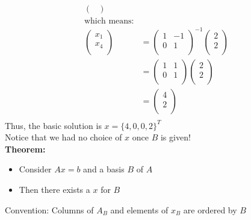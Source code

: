 \documentclass[letterpaper, 12pt]{article}
\newcommand{\red}[1]{{\color{red}{#1}}}
\begin{document}
\begin{align*}
\begin{pmatrix}
        \end{pmatrix}\\
        \text{which means:}\\
        \begin{pmatrix}
            x_1\\x_4\\
        \end{pmatrix} &= \begin{pmatrix}
            1 & -1\\
            0 & 1\\
        \end{pmatrix} ^ {-1} \begin{pmatrix}
            2\\2\\
        \end{pmatrix}\\
        &= \begin{pmatrix}
            1 & 1\\
            0 & 1\\
        \end{pmatrix}\begin{pmatrix}
            2\\2\\
        \end{pmatrix}\\
        &= \begin{pmatrix}
            4\\2\\
        \end{pmatrix}\\
    \end{align*}
    Thus, the basic solution is $x = \{4, 0, 0, 2\}^T$\\
    Notice that we had no choice of $x$ once $B$ is given!\\
    \bigskip
    \textbf{Theorem:}\\
    \begin{itemize}
        \item Consider $Ax = b$ and a basis $B$ of $A$\\
        \item Then there exists a \red{unique basic solution} $x$ for $B$
    \end{itemize}
    Convention: Columns of $A_B$ and elements of $x_B$ are ordered by $B$\\
    
\end{document}
